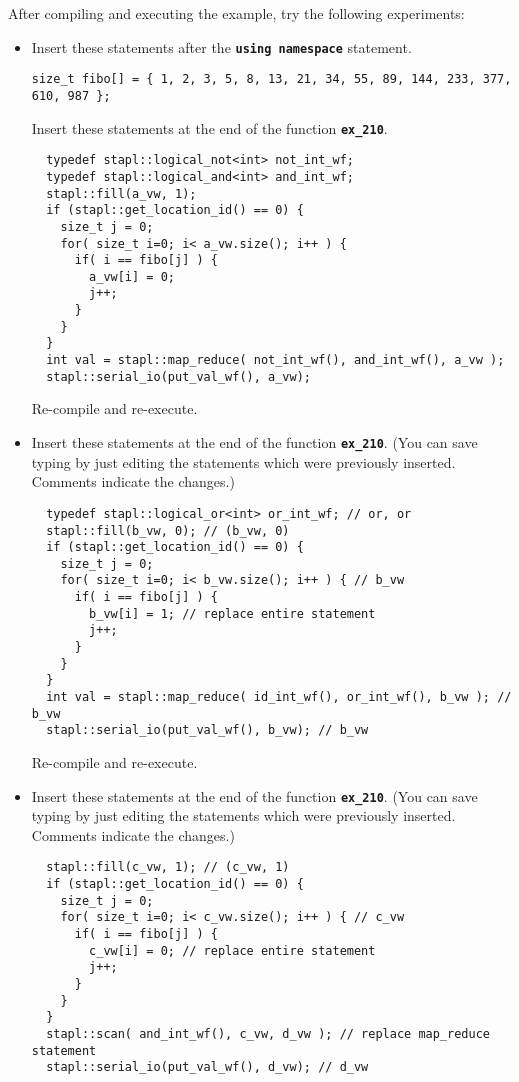 \documentclass{report}
\begin{document}
After compiling and executing the example, try the following experiments:
\begin{itemize}
\item
Insert these statements after the
\texttt{{\bf using namespace}}
statement.
\begin{verbatim}
size_t fibo[] = { 1, 2, 3, 5, 8, 13, 21, 34, 55, 89, 144, 233, 377, 610, 987 };
\end{verbatim}

Insert these statements at the end of the function
\texttt{{\bf ex\_210}}.
\begin{verbatim}
  typedef stapl::logical_not<int> not_int_wf;
  typedef stapl::logical_and<int> and_int_wf;
  stapl::fill(a_vw, 1);
  if (stapl::get_location_id() == 0) {
    size_t j = 0;
    for( size_t i=0; i< a_vw.size(); i++ ) {
      if( i == fibo[j] ) {
        a_vw[i] = 0;
        j++;
      }
    }
  }
  int val = stapl::map_reduce( not_int_wf(), and_int_wf(), a_vw );
  stapl::serial_io(put_val_wf(), a_vw);
\end{verbatim}
Re-compile and re-execute.
\item
Insert these statements at the end of the function
\texttt{{\bf ex\_210}}.
(You can save typing by just editing the statements which were previously
inserted.  Comments indicate the changes.)
\begin{verbatim}
  typedef stapl::logical_or<int> or_int_wf; // or, or
  stapl::fill(b_vw, 0); // (b_vw, 0)
  if (stapl::get_location_id() == 0) {
    size_t j = 0;
    for( size_t i=0; i< b_vw.size(); i++ ) { // b_vw
      if( i == fibo[j] ) {
        b_vw[i] = 1; // replace entire statement
        j++;
      }
    }
  }
  int val = stapl::map_reduce( id_int_wf(), or_int_wf(), b_vw ); // b_vw
  stapl::serial_io(put_val_wf(), b_vw); // b_vw
\end{verbatim}
Re-compile and re-execute.
\item
Insert these statements at the end of the function
\texttt{{\bf ex\_210}}.
(You can save typing by just editing the statements which were previously
inserted.  Comments indicate the changes.)
\begin{verbatim}
  stapl::fill(c_vw, 1); // (c_vw, 1)
  if (stapl::get_location_id() == 0) {
    size_t j = 0;
    for( size_t i=0; i< c_vw.size(); i++ ) { // c_vw
      if( i == fibo[j] ) {
        c_vw[i] = 0; // replace entire statement
        j++;
      }
    }
  }
  stapl::scan( and_int_wf(), c_vw, d_vw ); // replace map_reduce statement
  stapl::serial_io(put_val_wf(), d_vw); // d_vw
\end{verbatim}

\end{itemize}
\end{document}
